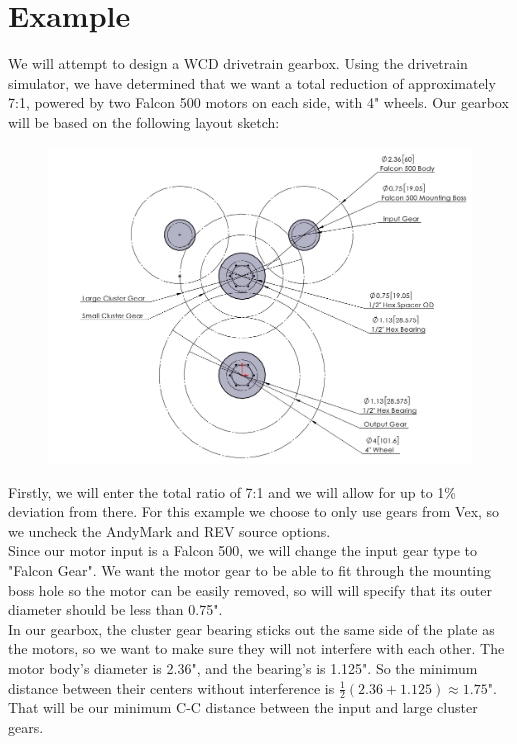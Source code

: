 \documentclass[a4paper]{article}
\begin{document}
	\section*{Example}
	
	We will attempt to design a WCD drivetrain gearbox. Using the drivetrain simulator, we have determined that we want a total reduction of approximately 7:1, powered by two Falcon 500 motors on each side, with 4" wheels. Our gearbox will be based on the following layout sketch:
	
	\begin{figure}[H]
		\centering
		\includegraphics[width=\linewidth]{gearbox_options_layout}
	\end{figure}

	Firstly, we will enter the total ratio of 7:1 and we will allow for up to 1\% deviation from there. For this example we choose to only use gears from Vex, so we uncheck the AndyMark and REV source options.\\
	
	Since our motor input is a Falcon 500, we will change the input gear type to "Falcon Gear". We want the motor gear to be able to fit through the mounting boss hole so the motor can be easily removed, so will will specify that its outer diameter should be less than 0.75".\\
	
	In our gearbox, the cluster gear bearing sticks out the same side of the plate as the motors, so we want to make sure they will not interfere with each other. The motor body's diameter is 2.36", and the bearing's is 1.125". So the minimum distance between their centers without interference is $ \frac{1}{2} \left( 2.36+1.125 \right) \approx 1.75 $". That will be our minimum C-C distance between the input and large cluster gears.\\
	
\end{document}
